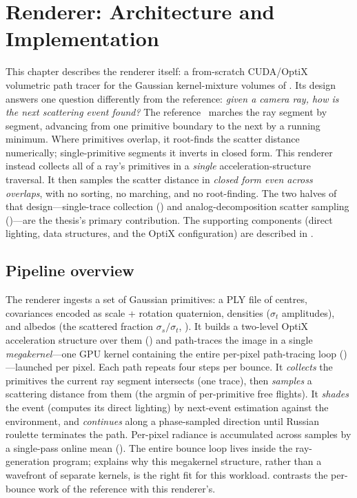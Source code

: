 \chapter{Renderer: Architecture and Implementation}
\label{ch:architecture}

This chapter describes the renderer itself: a from-scratch CUDA/OptiX volumetric path tracer for the
Gaussian kernel-mixture volumes of . Its design answers one question
differently from the reference: \emph{given a camera ray, how is the next scattering event found?}
The reference~\cite{DSYG} marches the ray segment by segment, advancing from one primitive
boundary to the next by a running minimum. Where primitives overlap, it root-finds the scatter
distance numerically; single-primitive segments it inverts in closed form. This renderer instead
collects all of a ray's primitives in a \emph{single} acceleration-structure traversal. It then
samples the scatter distance in \emph{closed form even across overlaps}, with no sorting, no
marching, and no root-finding. The two halves of that design---single-trace collection
() and analog-decomposition scatter sampling ()---are the
thesis's primary contribution. The supporting components (direct lighting, data structures, and the
OptiX configuration) are described in .

\section{Pipeline overview}
\label{sec:pipeline}

The renderer ingests a set of Gaussian primitives: a PLY file of centres, covariances encoded as
scale + rotation quaternion, densities ($\sigma_t$ amplitudes), and albedos (the
scattered fraction $\sigma_s/\sigma_t$, ). It
builds a two-level OptiX acceleration
structure over them () and path-traces the image in a single
\emph{megakernel}---one GPU kernel containing the entire per-pixel path-tracing loop
()---launched
per pixel. Each path repeats four steps per bounce. It \emph{collects} the primitives the current
ray segment intersects (one trace), then \emph{samples} a scattering distance from them (the argmin
of per-primitive free flights). It \emph{shades} the event (computes its direct lighting) by next-event estimation
against the environment, and \emph{continues} along a phase-sampled direction until Russian roulette terminates
the path. Per-pixel
radiance is accumulated across samples by a single-pass online mean (). The
entire bounce loop lives inside the ray-generation program;  explains why this
megakernel structure, rather than a wavefront of separate kernels, is the right fit for this
workload.  contrasts the per-bounce work of the reference with this renderer's.

